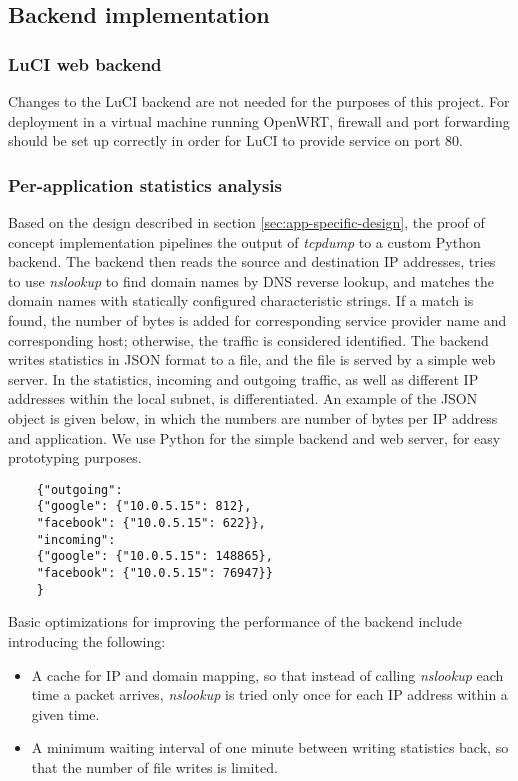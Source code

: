 \subsection{Backend implementation}

\subsubsection{LuCI web backend}

Changes to the LuCI backend are not needed for the purposes of this project. For deployment in a virtual machine running OpenWRT, firewall and port forwarding should be set up correctly in order for LuCI to provide service on port 80.

\subsubsection{Per-application statistics analysis}

Based on the design described in section \ref{sec:app-specific-design}, the proof of concept implementation pipelines the output of \textit{tcpdump} to a custom Python backend. The backend then reads the source and destination IP addresses, tries to use \textit{nslookup} to find domain names by DNS reverse lookup, and matches the domain names with statically configured characteristic strings. If a match is found, the number of bytes is added for corresponding service provider name and corresponding host; otherwise, the traffic is considered identified. The backend writes statistics in JSON format to a file, and the file is served by a simple web server. In the statistics, incoming and outgoing traffic, as well as different IP addresses within the local subnet, is differentiated. An example of the JSON object is given below, in which the numbers are number of bytes per IP address and application. We use Python for the simple backend and web server, for easy prototyping purposes.

\begin{listing}
	\begin{verbatim}
	{"outgoing": 
	{"google": {"10.0.5.15": 812}, 
	"facebook": {"10.0.5.15": 622}}, 
	"incoming": 
	{"google": {"10.0.5.15": 148865}, 
	"facebook": {"10.0.5.15": 76947}}
	}
	\end{verbatim}
\end{listing}

Basic optimizations for improving the performance of the backend include introducing the following:
\begin{itemize}
	
	\item A cache for IP and domain mapping, so that instead of calling \textit{nslookup} each time a packet arrives, \textit{nslookup} is tried only once for each IP address within a given time.
	
	\item A minimum waiting interval of one minute between writing statistics back, so that the number of file writes is limited.
	
\end{itemize}